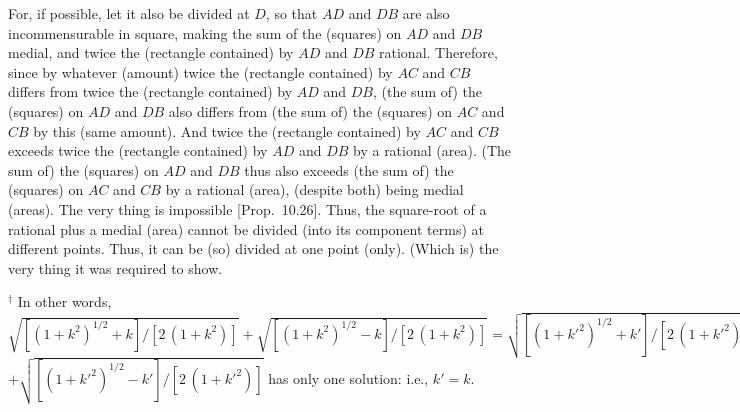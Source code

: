 \begin{Parallel}{}{}
{For, if possible, let it also be divided at $D$, so that
$AD$ and $DB$ are also incommensurable in square, making the sum of 
the (squares) on $AD$ and $DB$ medial, and twice the (rectangle
contained) by $AD$ and $DB$ rational. Therefore, since by whatever
(amount) twice the (rectangle contained) by $AC$ and $CB$
differs from twice the (rectangle contained) by $AD$ and $DB$, (the sum of) the (squares) on  $AD$ and $DB$ also differs from (the sum of) the
(squares) on
$AC$ and $CB$ by this
(same amount). And twice the (rectangle contained) by $AC$ and $CB$
exceeds twice the (rectangle contained) by $AD$ and $DB$ by a
rational (area). (The sum of) the (squares)
on $AD$ and $DB$ thus also exceeds (the sum of) the (squares) on $AC$ and $CB$ by a rational (area),
(despite both) being medial (areas). The very thing is impossible [Prop.~10.26]. Thus, the square-root of a rational
plus a medial (area) cannot be divided (into its component terms) at different points. Thus, it
can  be (so) divided at one point (only). (Which is) the very thing it was required to
show.}
\end{Parallel}
{\footnotesize\noindent$^\dag$ In other words, $\sqrt{[(1+k^2)^{1/2}+k]/[2\,(1+k^2)]} +\sqrt{[(1+k^2)^{1/2}-k]/[2\,(1+k^2)]}=\sqrt{[(1+k'^2)^{1/2}+k']/[2\,(1+k'^2)]}$\\$ +\sqrt{[(1+k'^2)^{1/2}-k']/[2\,(1+k'^2)]}$
has only one solution: {i.e.}, $k'=k$.}

